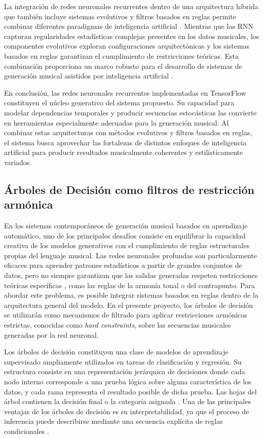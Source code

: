 \documentclass[12pt]{report}
\begin{document}
La integración de redes neuronales recurrentes dentro de una arquitectura híbrida que también incluye sistemas evolutivos y filtros basados en reglas permite combinar diferentes paradigmas de inteligencia artificial \cite{miranda2013evolutionary}. Mientras que las RNN capturan regularidades estadísticas complejas presentes en los datos musicales, los componentes evolutivos exploran configuraciones arquitectónicas y los sistemas basados en reglas garantizan el cumplimiento de restricciones teóricas. Esta combinación proporciona un marco robusto para el desarrollo de sistemas de generación musical asistidos por inteligencia artificial .

En conclusión, las redes neuronales recurrentes implementadas en TensorFlow constituyen el núcleo generativo del sistema propuesto. Su capacidad para modelar dependencias temporales y producir secuencias estocásticas las convierte en herramientas especialmente adecuadas para la generación musical. Al combinar estas arquitecturas con métodos evolutivos y filtros basados en reglas, el sistema busca aprovechar las fortalezas de distintos enfoques de inteligencia artificial para producir resultados musicalmente coherentes y estilísticamente variados.

\subsection{Árboles de Decisión como filtros de restricción armónica}
En los sistemas contemporáneos de generación musical basados en aprendizaje automático, uno de los principales desafíos consiste en equilibrar la capacidad creativa de los modelos generativos con el cumplimiento de reglas estructurales propias del lenguaje musical. Las redes neuronales profundas son particularmente eficaces para aprender patrones estadísticos a partir de grandes conjuntos de datos, pero no siempre garantizan que las salidas generadas respeten restricciones teóricas específicas \cite{briot2020deep}, como las reglas de la armonía tonal o del contrapunto. Para abordar este problema, es posible integrar sistemas basados en reglas dentro de la arquitectura general del modelo. En el presente proyecto, los árboles de decisión se utilizarán como mecanismos de filtrado para aplicar restricciones armónicas estrictas, conocidas como \textit{hard constraints}, sobre las secuencias musicales generadas por la red neuronal.

Los árboles de decisión constituyen una clase de modelos de aprendizaje supervisado ampliamente utilizados en tareas de clasificación y regresión. Su estructura consiste en una representación jerárquica de decisiones donde cada nodo interno corresponde a una prueba lógica sobre alguna característica de los datos, y cada rama representa el resultado posible de dicha prueba. Las hojas del árbol contienen la decisión final o la categoría asignada \cite{breiman2017classification}. Una de las principales ventajas de los árboles de decisión es su interpretabilidad, ya que el proceso de inferencia puede describirse mediante una secuencia explícita de reglas condicionales \cite{molnar2020interpretable}.
\end{document}
